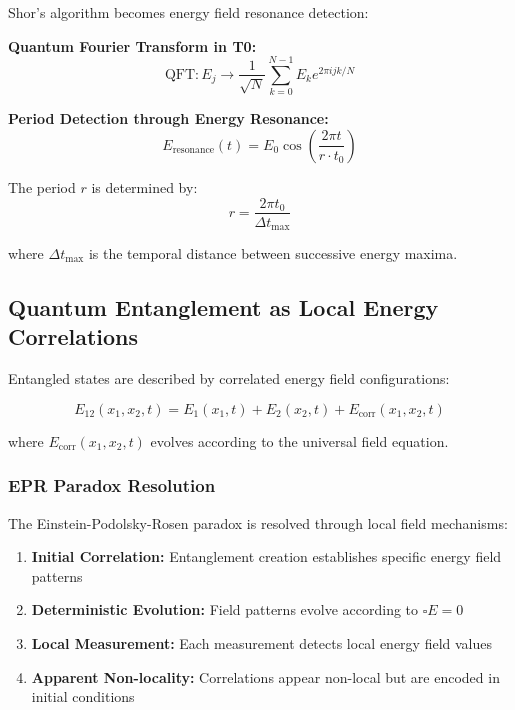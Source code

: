 \documentclass[12pt,a4paper]{article}
\theoremstyle{definition}
\begin{document}
Shor's algorithm becomes energy field resonance detection:

\textbf{Quantum Fourier Transform in T0:}
\begin{equation}
	\text{QFT}: E_j \rightarrow \frac{1}{\sqrt{N}} \sum_{k=0}^{N-1} E_k e^{2\pi i jk/N}
\end{equation}

\textbf{Period Detection through Energy Resonance:}
\begin{equation}
	E_{\text{resonance}}(t) = E_0 \cos\left(\frac{2\pi t}{r \cdot t_0}\right)
\end{equation}

The period $r$ is determined by:
\begin{equation}
	r = \frac{2\pi t_0}{\Delta t_{\text{max}}}
\end{equation}

where $\Delta t_{\text{max}}$ is the temporal distance between successive energy maxima.

\subsection{Quantum Entanglement as Local Energy Correlations}

Entangled states are described by correlated energy field configurations:

\begin{equation}
	E_{12}(x_1,x_2,t) = E_1(x_1,t) + E_2(x_2,t) + E_{\text{corr}}(x_1,x_2,t)
\end{equation}

where $E_{\text{corr}}(x_1,x_2,t)$ evolves according to the universal field equation.

\subsubsection{EPR Paradox Resolution}

The Einstein-Podolsky-Rosen paradox is resolved through local field mechanisms:

\begin{enumerate}
	\item \textbf{Initial Correlation:} Entanglement creation establishes specific energy field patterns
	\item \textbf{Deterministic Evolution:} Field patterns evolve according to $\square E = 0$
	\item \textbf{Local Measurement:} Each measurement detects local energy field values
	\item \textbf{Apparent Non-locality:} Correlations appear non-local but are encoded in initial conditions
\end{enumerate}
\end{document}
